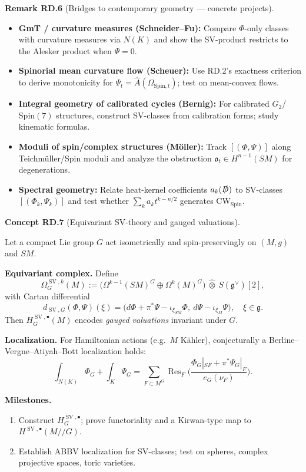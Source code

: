 \documentclass[10pt, letterpaper]{article}
\newcommand{\Spin}{\mathrm{Spin}}
\newcommand{\CustomHeading}[3]{%
  \par\medskip\noindent%
  \textbf{#1 #2} \textnormal{(#3)}.\enskip%
}
\newenvironment{REM}[2]{\begin{unitbox}\CustomHeading{Remark}{#1}{#2}}{\end{unitbox}}
\newenvironment{CONC}[2]{\begin{unitbox}\CustomHeading{Concept}{#1}{#2}}{\end{unitbox}}
\begin{document}
\begin{REM}{RD.6}{Bridges to contemporary geometry — concrete projects}
\begin{itemize}
  \item \textbf{GmT / curvature measures (Schneider--Fu):}
        Compare $\Phi$-only classes with curvature measures via $N(K)$ and show the SV-product restricts to the Alesker product when $\Psi=0$.
  \item \textbf{Spinorial mean curvature flow (Scheuer):}
        Use RD.2’s exactness criterion to derive monotonicity for $\Psi_t=\widehat A(\Omega_{\Spin,t})$; test on mean-convex flows.
  \item \textbf{Integral geometry of calibrated cycles (Bernig):}
        For calibrated $G_2$/$\Spin(7)$ structures, construct SV-classes from calibration forms; study kinematic formulas.
  \item \textbf{Moduli of spin/complex structures (Möller):}
        Track $[(\Phi,\Psi)]$ along Teichmüller/Spin moduli and analyze the obstruction $\mathfrak o_t\in H^{n-1}(SM)$ for degenerations.
  \item \textbf{Spectral geometry:}
        Relate heat-kernel coefficients $a_k(\slashed D)$ to SV-classes $[(\Phi_k,\Psi_k)]$ and test whether $\sum_k a_k t^{k-n/2}$ generates $\mathrm{CW}_{\Spin}$.
\end{itemize}
\end{REM}

\begin{CONC}{RD.7}{Equivariant SV-theory and gauged valuations}
Let a compact Lie group $G$ act isometrically and spin-preservingly on $(M,g)$ and $SM$.

\medskip\noindent\textbf{Equivariant complex.}
Define
\[
\Omega_G^{\operatorname{SV},k}(M):=\big(\Omega^{k-1}(SM)^G\oplus\Omega^k(M)^G\big)\ \widehat\otimes\ S(\mathfrak g^\vee)[2],
\]
with Cartan differential
\[
d_{\operatorname{SV},G}(\Phi,\Psi)(\xi)=\Big(d\Phi+\pi^*\Psi-\iota_{\xi_{SM}}\Phi,\ d\Psi-\iota_{\xi_M}\Psi\Big),\quad \xi\in\mathfrak g.
\]
Then $H_G^{\operatorname{SV},\bullet}(M)$ encodes \emph{gauged valuations} invariant under $G$.

\medskip\noindent\textbf{Localization.}
For Hamiltonian actions (e.g.\ $M$ Kähler), conjecturally a Berline–Vergne–Atiyah–Bott localization holds:
\[
\int_{N(K)}\Phi_G+\int_K\Psi_G=\sum_{F\subset M^G}\operatorname{Res}_F\!\Big(\frac{\Phi_G|_{SF}+\pi^*\Psi_G|_F}{e_G(\nu_F)}\Big).
\]

\medskip\noindent\textbf{Milestones.}
\begin{enumerate}[label=(\roman*)]
\item Construct $H_G^{\operatorname{SV},\bullet}$; prove functoriality and a Kirwan-type map to $H^{\operatorname{SV},\bullet}(M{/}{/}G)$.
\item Establish ABBV localization for SV-classes; test on spheres, complex projective spaces, toric varieties.
\end{enumerate}
\end{CONC}
\end{document}
